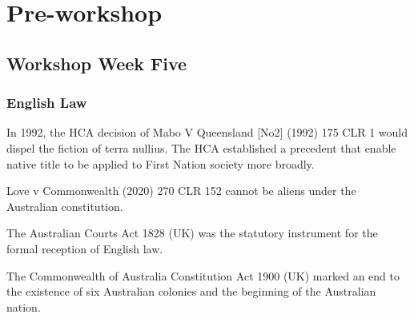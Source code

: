 \section*{Pre-workshop}

\subsection*{Workshop Week Five}
\date{April 8th}

\subsubsection{English Law}
In 1992, the HCA decision of Mabo V Queensland [No2] (1992) 175 CLR 1 would dispel the fiction of terra nullius. The HCA established a precedent that enable native title to be applied to First Nation society more broadly. 

Love v Commonwealth (2020) 270 CLR 152 cannot be aliens under the Australian constitution. 

The Australian Courts Act 1828 (UK) was the statutory instrument for the formal reception of English law.

The Commonwealth of Australia Constitution Act 1900 (UK) marked an end to the existence of six Australian colonies and the beginning of the Australian nation. 


